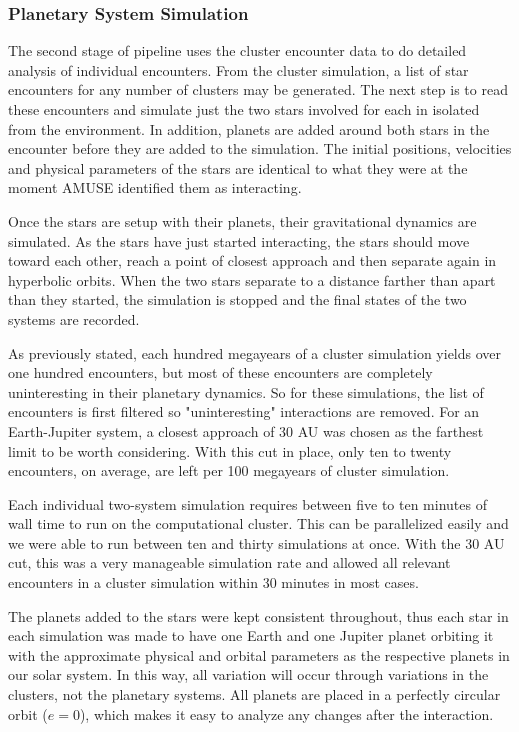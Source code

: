 \documentclass[12pt]{article}
\begin{document}
    \subsubsection{Planetary System Simulation}

    The second stage of pipeline uses the cluster encounter data to do
    detailed analysis of individual encounters.
    From the cluster simulation, a list of star encounters for any number of 
    clusters may be generated. The next step is to read these encounters and
    simulate just the two stars involved for each in isolated from the 
    environment. In addition, planets are added around both stars in the
    encounter before they are added to the simulation. The initial positions,
    velocities and physical parameters of the stars are identical to what they
    were at the moment AMUSE identified them as interacting. 

    Once the stars are setup with their planets, their gravitational dynamics
    are simulated. As the stars have just started interacting, the stars should
    move toward each other, reach a point of closest approach and then separate again
    in hyperbolic orbits. When the two stars separate to a distance farther than
    apart than they started, the simulation is stopped and the final states of the two
    systems are recorded. 

    As previously stated, each hundred megayears of a cluster simulation yields over
    one hundred encounters, but most of these encounters are completely uninteresting
    in their planetary dynamics. So for these simulations, the list of encounters is 
    first filtered so "uninteresting" interactions are removed. For an Earth-Jupiter
    system, a closest approach of 30 AU was chosen as the farthest limit to be
    worth considering. With this cut in place, only ten to twenty encounters, on
    average, are left per 100 megayears of cluster simulation.


    Each individual two-system simulation requires between five to ten 
    minutes of wall time to run on the computational cluster. This can be
    parallelized easily and we were able to run between ten and thirty 
    simulations at once. With the 30 AU cut, this was a very manageable 
    simulation rate and allowed all relevant encounters in a cluster simulation
    within 30 minutes in most cases.

    The planets added to the stars were kept consistent throughout, thus 
    each star in each simulation was made to have one Earth and one Jupiter planet
    orbiting it with the approximate physical and orbital
    parameters as the respective planets in our solar system. 
    In this way, all variation will occur through variations in the clusters, not
    the planetary systems.
    All planets are
    placed in a perfectly circular orbit ($e=0$), which makes it easy to analyze
    any changes after the interaction.
\end{document}
